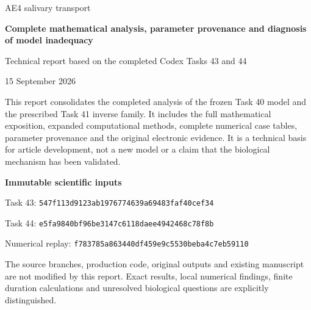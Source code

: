 \documentclass[11pt,a4paper]{article}
\begin{document}
\begin{titlepage}
\centering
\vspace*{18mm}
{\Large AE4 salivary transport\par}
\vspace{8mm}
{\huge\bfseries Complete mathematical analysis, parameter provenance and diagnosis of model inadequacy\par}
\vspace{12mm}
{\Large Technical report based on the completed Codex Tasks 43 and 44\par}
\vspace{10mm}
{15 September 2026\par}
\vfill
\begin{minipage}{.94\textwidth}
This report consolidates the completed analysis of the frozen Task 40 model and the prescribed Task 41 inverse family. It includes the full mathematical exposition, expanded computational methods, complete numerical case tables, parameter provenance and the original electronic evidence. It is a technical basis for article development, not a new model or a claim that the biological mechanism has been validated.

\medskip
\textbf{Immutable scientific inputs}\par
Task 43: \nolinkurl{547f113d9123ab1976774639a69483faf40cef34}\par
Task 44: \nolinkurl{e5fa9840bf96be3147c6118daee4942468c78f8b}\par
Numerical replay: \nolinkurl{f783785a863440df459e9c5530beba4c7eb59110}

\medskip
The source branches, production code, original outputs and existing manuscript are not modified by this report. Exact results, local numerical findings, finite duration calculations and unresolved biological questions are explicitly distinguished.
\end{minipage}
\end{titlepage}
\end{document}
